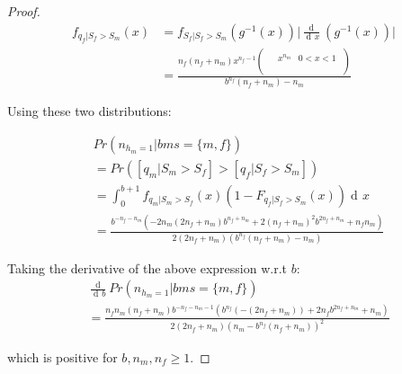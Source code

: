 \documentclass[11pt]{article}
\DeclareMathOperator{\di}{d\!}
\begin{document}
\begin{proof}
    \begin{align*}
        f_{q_f|S_f > S_m}(x) & = f_{S_f|S_f > S_m} (g^{-1}(x)) \lvert \frac{\di}{\di x} (g^{-1}(x)) \rvert \\
                             & = \frac{n_f (n_f+n_m) x^{n_f-1} \left(
            \begin{array}{cc}
                     &
                    \begin{array}{cc}
                        x^{n_m} & 0<x<1 \\
                    \end{array}
                    \\
                \end{array}
            \right)}{b^{n_f} (n_f+n_m)-n_m}
    \end{align*}

    Using these two distributions:

    \begin{align*}
         & Pr(n_{h_m=1}|bm{s}=\{m,f\})                                                                                                                             \\
         & = Pr([q_m|S_m > S_f] > [q_f|S_f > S_m])                                                                                                                 \\
         & = \int_{0}^{b+1} f_{q_m|S_m > S_f}(x) (1-F_{q_f|S_f > S_m}(x)) \di x                                                                                    \\
         & = \frac{b^{-n_f-n_m} \left(-2 n_m (2 n_f+n_m) b^{n_f+n_m}+2 (n_f+n_m)^2 b^{2 n_f+n_m}+n_f n_m\right)}{2 (2 n_f+n_m) \left(b^{n_f} (n_f+n_m)-n_m\right)}
    \end{align*}

    Taking the derivative of the above expression w.r.t $b$:
    \begin{align*}
         & \frac{\di}{\di b} Pr(n_{h_m=1}|bm{s}=\{m,f\})                                                                                                             \\
         & = \frac{n_f n_m (n_f+n_m) b^{-n_f-n_m-1} \left(b^{n_f} (-(2 n_f+n_m))+2 n_f b^{2 n_f+n_m}+n_m\right)}{2 (2 n_f+n_m) \left(n_m-b^{n_f} (n_f+n_m)\right)^2}
    \end{align*}

    which is positive for $b, n_m, n_f \geq 1$.

\end{proof}
\end{document}
